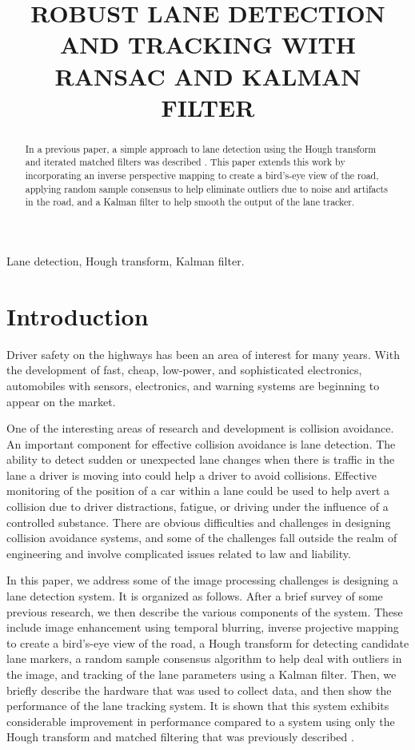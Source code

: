 \documentclass{article}
\title{ROBUST LANE DETECTION AND TRACKING WITH RANSAC AND KALMAN FILTER}
\begin{document}
%
\maketitle
%
\begin{abstract}
In a previous paper, a simple approach to lane detection using the Hough
transform and iterated matched filters was described \cite{borkar_layered_2009}.
This paper extends this work by incorporating an inverse perspective mapping
to create a bird's-eye view of the road, applying random sample consensus to help
eliminate outliers due to noise and artifacts in the road, and a Kalman filter
to help smooth the output of the lane tracker.
\end{abstract}
%
\begin{keywords}
Lane detection, Hough transform, Kalman filter.
\end{keywords}
%
\section{Introduction}
\label{sec:intro}
Driver safety on the highways has been an area of interest for many years.
With the development of fast, cheap, low-power, and sophisticated electronics,
automobiles with sensors, electronics, and warning systems are beginning to appear on the market.

One of the interesting areas of research and development is collision avoidance.
An important component for effective collision avoidance is lane detection.
The ability to detect sudden or unexpected lane changes when there
is traffic in the lane a driver is moving into could help a driver to avoid
collisions.
Effective monitoring of the position of a car within a lane could be used to
help avert a collision due to driver distractions, fatigue, or driving under the influence of a controlled substance.
There are obvious difficulties and challenges in designing collision avoidance
systems, and some of the challenges fall outside the realm of engineering and
involve complicated issues related to law and liability.

In this paper, we address some of the image processing challenges is designing a
lane detection system.  It is organized as follows.
After a brief survey of some previous research, we then describe the various
components of the system.  These include image enhancement using temporal blurring,
inverse projective mapping to create a bird's-eye view of the road, a Hough transform
for detecting candidate lane markers, a random sample consensus algorithm to
help deal with outliers in the image, and tracking of the lane parameters using a Kalman filter.
Then, we briefly describe the hardware that was used to collect data, and
then show the performance of the lane tracking system.
It is shown that this system exhibits considerable improvement in
performance compared to a system using only the Hough transform and matched filtering that was previously described \cite{borkar_layered_2009}.
\end{document}
